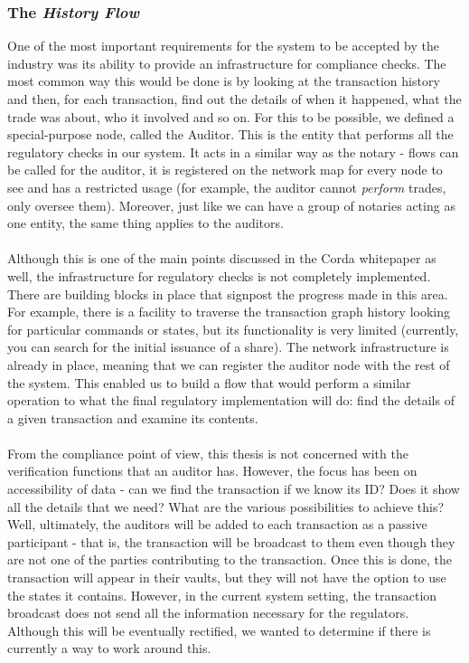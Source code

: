 \documentclass[12pt,twoside]{article}
\begin{document}
\subsubsection{The \textit{History Flow}}
\label{sub:history}
One of the most important requirements for the system to be accepted by the industry was its ability to provide an infrastructure for compliance checks. The most common way this would be done is by looking at the transaction history and then, for each transaction, find out the details of when it happened, what the trade was about, who it involved and so on. For this to be possible, we defined a special-purpose node, called the Auditor. This is the entity that performs all the regulatory checks in our system. It acts in a similar way as the notary - flows can be called for the auditor, it is registered on the network map for every node to see and has a restricted usage (for example, the auditor cannot \textit{perform} trades, only oversee them). Moreover, just like we can have a group of notaries acting as one entity, the same thing applies to the auditors.
\\ \\
Although this is one of the main points discussed in the Corda whitepaper as well, the infrastructure for regulatory checks is not completely implemented. There are building blocks in place that signpost the progress made in this area. For example, there is a facility to traverse the transaction graph history looking for particular commands or states, but its functionality is very limited (currently, you can search for the initial issuance of a share). The network infrastructure is already in place, meaning that we can register the auditor node with the rest of the system. This enabled us to build a flow that would perform a similar operation to what the final regulatory implementation will do: find the details of a given transaction and examine its contents.
\\ \\
From the compliance point of view, this thesis is not concerned with the verification functions that an auditor has. However, the focus has been on accessibility of data - can we find the transaction if we know its ID? Does it show all the details that we need? What are the various possibilities to achieve this? Well, ultimately, the auditors will be added to each transaction as a passive participant - that is, the transaction will be broadcast to them even though they are not one of the parties contributing to the transaction. Once this is done, the transaction will appear in their vaults, but they will not have the option to use the states it contains. However, in the current system setting, the transaction broadcast does not send all the information necessary for the regulators. Although this will be eventually rectified, we wanted to determine if there is currently a way to work around this.
\end{document}
